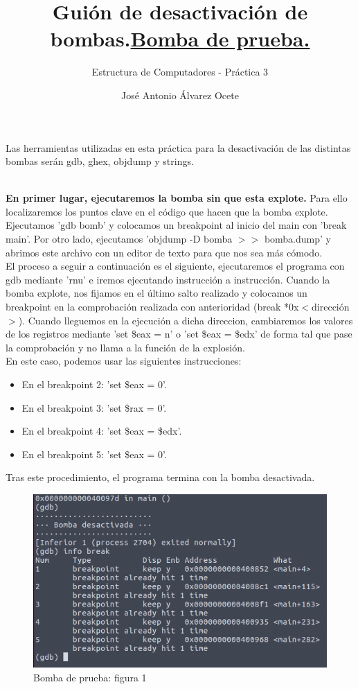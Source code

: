 \documentclass[11pt,a4paper]{article}
\title{Guión de desactivación de bombas.}
\author{Estructura de Computadores - Práctica 3}
\date{José Antonio Álvarez Ocete}
\begin{document}
\maketitle 

Las herramientas utilizadas en esta práctica para la desactivación de las distintas bombas serán gdb, ghex, objdump y strings. \\

\title{\large{\textbf{\underline{Bomba de prueba.}}}} \\

\textbf{En primer lugar, ejecutaremos la bomba sin que esta explote.} Para ello localizaremos los puntos clave en el código que hacen que la bomba explote. Ejecutamos 'gdb bomb' y colocamos un breakpoint al inicio del main con 'break main'. Por otro lado, ejecutamos 'objdump -D bomba $>>$ bomba.dump' y abrimos este archivo con un editor de texto para que nos sea más cómodo. \\

El proceso a seguir a continuación es el siguiente, ejecutaremos el programa con gdb mediante 'rnu' e iremos ejecutando instrucción a instrucción. Cuando la bomba explote, nos fijamos en el último salto realizado y colocamos un breakpoint en la comprobación realizada con anterioridad (break *0x$<$dirección$>$). Cuando lleguemos en la ejecución a dicha direccion, cambiaremos los valores de los registros mediante 'set \$eax = n' o 'set \$eax = \$edx' de forma tal que pase la comprobación y no llama a la función de la explosión. \\ 

En este caso, podemos usar las siguientes instrucciones:
\begin{itemize}
	\item En el breakpoint 2: 'set \$eax = 0'. 
	\item En el breakpoint 3: 'set \$rax = 0'.
	\item En el breakpoint 4: 'set \$eax = \$edx'.
	\item En el breakpoint 5: 'set \$eax = 0'.
\end{itemize}

Tras este procedimiento, el programa termina con la bomba desactivada. \\

\begin{figure}[H] 
 \centering
 \includegraphics[scale=0.45]{capturas/prueba1.png} 
 \caption{Bomba de prueba: figura 1} \label{fig:figura25}
\end{figure}
\end{document}
